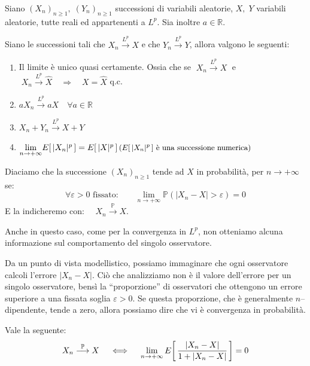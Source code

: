 \begin{teorema}
    Siano $(X_n)_{n\geq1}, \;(Y_n)_{n\geq1}$ successioni di variabili aleatorie, $X, \;Y$ variabili aleatorie, tutte reali ed appartenenti a $L^p$. Sia inoltre $a\in\mathbb R$.

    \medskip
    \noindent Siano le successioni tali che $X_n \overset{L^p}{\longrightarrow}X$ e che $Y_n \overset{L^p}{\longrightarrow}Y$, allora valgono le seguenti:
    \begin{enumerate}
        \item Il limite è unico quasi certamente. Ossia che se $\;X_n \overset{L^p}{\longrightarrow}X\;$ e $\;X_n \overset{L^p}{\longrightarrow}\widehat{X}\quad \Rightarrow\quad X = \widehat{X}$ q.c.
        \item $aX_n \overset{L^p}{\longrightarrow}aX \quad \forall a\in \mathbb R$
        \item $X_n + Y_n \overset{L^p}{\longrightarrow}X + Y$
        \item $\underset{n\to+\infty}{\lim} \E{|X_n|^p} = \E{|X|^p}\hfill \text{\small ($\E{|X_n|^p}$ è una successione numerica)}$
    \end{enumerate}
\end{teorema}

\begin{definizione}
    Diaciamo che la successione $(X_n)_{n\geq1}$ tende ad $X$ in probabilità, per $n\to+\infty$ se:
    \[\forall \varepsilon > 0 \text{ fissato:}\qquad \lim_{n\to+\infty} \mathbb{P}\left(|X_n-X|>\varepsilon\right) = 0\]
    E la indicheremo con: $\quad X_n \overset{\mathbb{P}}{\longrightarrow}X$.
\end{definizione}

Anche in questo caso, come per la convergenza in \(L^p\), non otteniamo alcuna informazione sul comportamento del singolo osservatore.

\medskip
\noindent Da un punto di vista modellistico, possiamo immaginare che ogni osservatore calcoli l’errore \( |X_n - X| \). Ciò che analizziamo non è il valore dell’errore per un singolo osservatore, bensì la ``proporzione'' di osservatori che ottengono un errore superiore a una fissata soglia \(\varepsilon > 0\). Se questa proporzione, che è generalmente $n$--dipendente, tende a zero, allora possiamo dire che vi è convergenza in probabilità.

\begin{proposizione}
\label{prop:15.10}
Vale la seguente:
    \[X_n \overset{\mathbb{P}}{\longrightarrow}X \quad \iff \quad \lim_{n\to+\infty}E\!\left[\,\frac{|X_n-X|}{1 + |X_n -X|}\,\right]  = 0\]
\end{proposizione}

